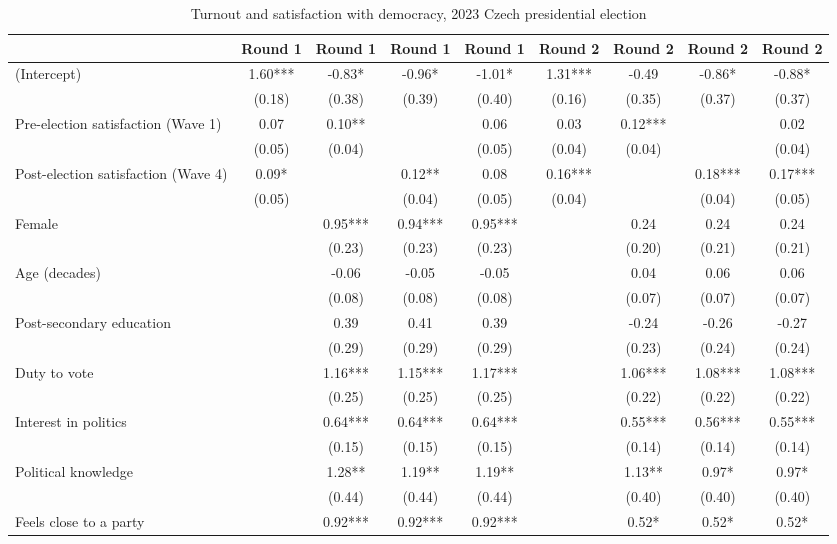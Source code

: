 \begin{table}

\caption{\label{tab:unnamed-chunk-2}Turnout and satisfaction with democracy, 2023 Czech presidential election}
\centering
\begin{tabular}[t]{lcccccccc}
\toprule
  & Round 1 & Round 1  & Round 1   & Round 1    & Round 2 & Round 2  & Round 2   & Round 2   \\
\midrule
(Intercept) & 1.60*** & -0.83* & -0.96* & -1.01* & 1.31*** & -0.49 & -0.86* & -0.88*\\
 & (0.18) & (0.38) & (0.39) & (0.40) & (0.16) & (0.35) & (0.37) & (0.37)\\
Pre-election satisfaction (Wave 1) & 0.07 & 0.10** &  & 0.06 & 0.03 & 0.12*** &  & 0.02\\
 & (0.05) & (0.04) &  & (0.05) & (0.04) & (0.04) &  & (0.04)\\
Post-election satisfaction (Wave 4) & 0.09* &  & 0.12** & 0.08 & 0.16*** &  & 0.18*** & 0.17***\\
 & (0.05) &  & (0.04) & (0.05) & (0.04) &  & (0.04) & (0.05)\\
Female &  & 0.95*** & 0.94*** & 0.95*** &  & 0.24 & 0.24 & 0.24\\
 &  & (0.23) & (0.23) & (0.23) &  & (0.20) & (0.21) & (0.21)\\
Age (decades) &  & -0.06 & -0.05 & -0.05 &  & 0.04 & 0.06 & 0.06\\
 &  & (0.08) & (0.08) & (0.08) &  & (0.07) & (0.07) & (0.07)\\
Post-secondary education &  & 0.39 & 0.41 & 0.39 &  & -0.24 & -0.26 & -0.27\\
 &  & (0.29) & (0.29) & (0.29) &  & (0.23) & (0.24) & (0.24)\\
Duty to vote &  & 1.16*** & 1.15*** & 1.17*** &  & 1.06*** & 1.08*** & 1.08***\\
 &  & (0.25) & (0.25) & (0.25) &  & (0.22) & (0.22) & (0.22)\\
Interest in politics &  & 0.64*** & 0.64*** & 0.64*** &  & 0.55*** & 0.56*** & 0.55***\\
 &  & (0.15) & (0.15) & (0.15) &  & (0.14) & (0.14) & (0.14)\\
Political knowledge &  & 1.28** & 1.19** & 1.19** &  & 1.13** & 0.97* & 0.97*\\
 &  & (0.44) & (0.44) & (0.44) &  & (0.40) & (0.40) & (0.40)\\
Feels close to a party &  & 0.92*** & 0.92*** & 0.92*** &  & 0.52* & 0.52* & 0.52*\\

\end{tabular}
\end{table}
